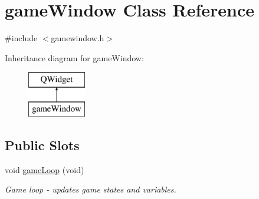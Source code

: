 \hypertarget{classgame_window}{}\section{game\+Window Class Reference}
\label{classgame_window}


{\ttfamily \#include $<$gamewindow.\+h$>$}

Inheritance diagram for game\+Window\+:\begin{figure}[H]
\begin{center}
\leavevmode
\includegraphics[height=2.000000cm]{classgame_window}
\end{center}
\end{figure}
\subsection*{Public Slots}
\begin{DoxyCompactItemize}
\item 
void \mbox{\hyperlink{classgame_window_a2aeb402950ac1faa754288a9e7464563}{game\+Loop}} (void)
\begin{DoxyCompactList}\small\item\em Game loop -\/ updates game states and variables. \end{DoxyCompactList}\end{DoxyCompactItemize}
